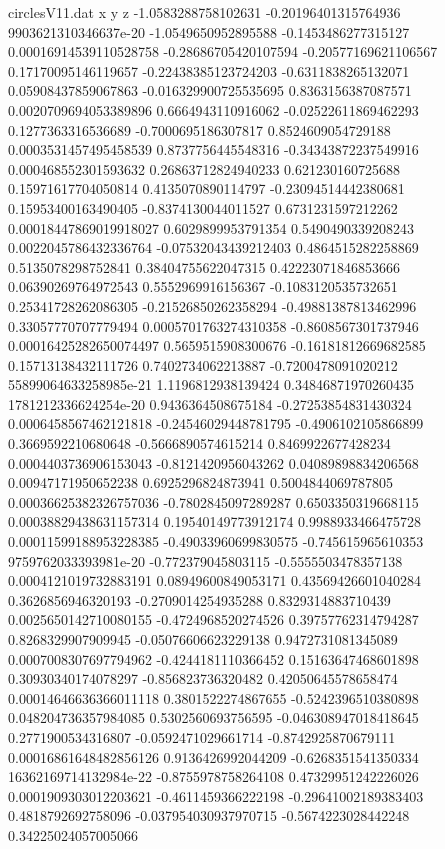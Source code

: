\begin{filecontents}{circlesV11.dat}
x y z
-1.0583288758102631	-0.20196401315764936	9903621310346637e-20
-1.0549650952895588	-0.1453486277315127	0.00016914539110528758
-0.28686705420107594	-0.20577169621106567	0.17170095146119657
-0.22438385123724203	-0.6311838265132071	0.05908437859067863
-0.016329900725535695	0.8363156387087571	0.0020709694053389896
0.6664943110916062	-0.02522611869462293	0.1277363316536689
-0.7000695186307817	0.8524609054729188	0.0003531457495458539
0.8737756445548316	-0.34343872237549916	0.000468552301593632
0.26863712824940233	0.621230160725688	0.15971617704050814
0.4135070890114797	-0.23094514442380681	0.15953400163490405
-0.8374130044011527	0.6731231597212262	0.00018447869019918027
0.6029899953791354	0.5490490339208243	0.0022045786432336764
-0.07532043439212403	0.4864515282258869	0.5135078298752841
0.38404755622047315	0.42223071846853666	0.06390269764972543
0.5552969916156367	-0.1083120535732651	0.25341728262086305
-0.21526850262358294	-0.49881387813462996	0.33057770707779494
0.0005701763274310358	-0.8608567301737946	0.00016425282650074497
0.5659515908300676	-0.16181812669682585	0.15713138432111726
0.7402734062213887	-0.7200478091020212	55899064633258985e-21
1.1196812938139424	0.34846871970260435	1781212336624254e-20
0.9436364508675184	-0.27253854831430324	0.0006458567462121818
-0.24546029448781795	-0.4906102105866899	0.3669592210680648
-0.5666890574615214	0.8469922677428234	0.0004403736906153043
-0.8121420956043262	0.04089898834206568	0.00947171950652238
0.6925296824873941	0.5004844069787805	0.00036625382326757036
-0.7802845097289287	0.6503350319668115	0.00038829438631157314
0.19540149773912174	0.9988933466475728	0.00011599188953228385
-0.49033960699830575	-0.745615965610353	9759762033393981e-20
-0.772379045803115	-0.5555503478357138	0.0004121019732883191
0.08949600849053171	0.43569426601040284	0.3626856946320193
-0.2709014254935288	0.8329314883710439	0.0025650142710080155
-0.4724968520274526	0.39757762314794287	0.8268329907909945
-0.05076606623229138	0.9472731081345089	0.0007008307697794962
-0.4244181110366452	0.15163647468601898	0.30930340174078297
-0.856823736320482	0.42050645578658474	0.00014646636366011118
0.3801522274867655	-0.5242396510380898	0.048204736357984085
0.5302560693756595	-0.046308947018418645	0.2771900534316807
-0.0592471029661714	-0.8742925870679111	0.00016861648482856126
0.9136426992044209	-0.6268351541350334	16362169714132984e-22
-0.8755978758264108	0.47329951242226026	0.0001909303012203621
-0.4611459366222198	-0.29641002189383403	0.4818792692758096
-0.037954030937970715	-0.5674223028442248	0.34225024057005066

\end{filecontents}
